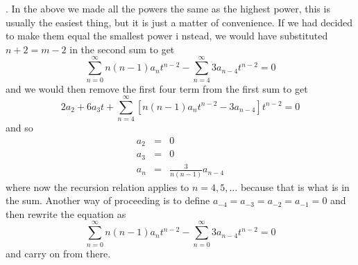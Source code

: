 \documentclass[12pt]{article}
\begin{document}
{\begin{enumerate}
\vskip 1cm 
. In the above we made all the powers the same as the
highest power, this is usually the easiest thing, but it is just a
matter of convenience. If we had decided to make them equal the smallest power i
nstead, we would have substituted $n+2=m-2$ in the second sum to get
\begin{equation}
\sum_{n=0}^\infty{n(n-1)a_nt^{n-2}}-\sum_{n=4}^\infty{3a_{n-4}t^{n-2}}=0
\end{equation}
and we would then remove the first four term from the first sum to get
\begin{equation}
2a_2+6a_3t+\sum_{n=4}^\infty{\left[n(n-1)a_nt^{n-2}-3a_{n-4}\right]t^{n-2}}=0
\end{equation}
and so 
\begin{eqnarray}
a_2&=&0\nonumber\\
a_3&=&0\nonumber\\
a_n&=&\frac{3}{n(n-1)}a_{n-4}
\end{eqnarray}
where now the recursion relation applies to $n=4,5,\ldots$ because that
is what is in the sum. Another way of proceeding is to define $a_{-4}=a_{-3}=a_{
-2}=a_{-1}=0$ and then rewrite the equation as
\begin{equation}
\sum_{n=0}^\infty{n(n-1)a_nt^{n-2}}-\sum_{n=0}^\infty{3a_{n-4}t^{n-2}}=0
\end{equation}
and carry on from there.
\end{enumerate}
}
\end{document}
